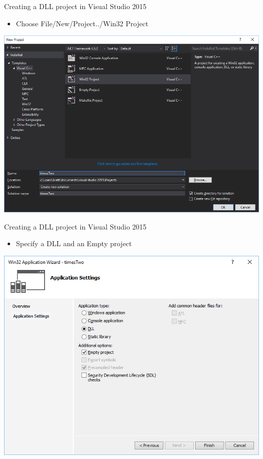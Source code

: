 \documentclass[ignorenonframetext,]{beamer}
\providecommand{\tightlist}{%
\setlength{\itemsep}{0pt}\setlength{\parskip}{0pt}}
\begin{document}
\begin{frame}{Creating a DLL project in Visual Studio 2015}

\begin{itemize}
\tightlist
\item
  Choose File/New/Project../Win32 Project
\end{itemize}

\centerline{
  \includegraphics[width=\textwidth,height=0.7\textheight,keepaspectratio]{./project.png}
}

\end{frame}

\begin{frame}{Creating a DLL project in Visual Studio 2015}

\begin{itemize}
\tightlist
\item
  Specify a DLL and an Empty project
\end{itemize}

\centerline{
  \includegraphics[width=\textwidth,height=0.7\textheight,keepaspectratio]{./settings.png}
}

\end{frame}
\end{document}
